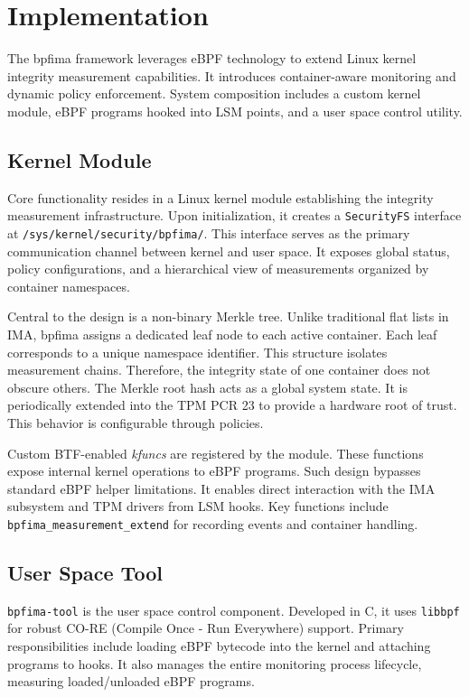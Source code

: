 \section{Implementation}
\label{sec:implementation}

The \ac{bpfima} framework leverages \ac{eBPF} technology to extend Linux kernel integrity measurement capabilities.
It introduces container-aware monitoring and dynamic policy enforcement.
System composition includes a custom kernel module, \ac{eBPF} programs hooked into \ac{LSM} points, and a user space control utility.

\subsection{Kernel Module}
Core functionality resides in a Linux kernel module establishing the integrity measurement infrastructure.
Upon initialization, it creates a \texttt{SecurityFS} interface at \texttt{/sys/kernel/security/bpfima/}.
This interface serves as the primary communication channel between kernel and user space.
It exposes global status, policy configurations, and a hierarchical view of measurements organized by container namespaces.

Central to the design is a non-binary Merkle tree.
Unlike traditional flat lists in \ac{IMA}, \ac{bpfima} assigns a dedicated leaf node to each active container.
Each leaf corresponds to a unique namespace identifier.
This structure isolates measurement chains.
Therefore, the integrity state of one container does not obscure others.
The Merkle root hash acts as a global system state.
It is periodically extended into the \ac{TPM} \ac{PCR} 23 to provide a hardware root of trust.
This behavior is configurable through policies.

Custom \ac{BTF}-enabled \textit{kfuncs} are registered by the module.
These functions expose internal kernel operations to \ac{eBPF} programs.
Such design bypasses standard \ac{eBPF} helper limitations.
It enables direct interaction with the \ac{IMA} subsystem and \ac{TPM} drivers from \ac{LSM} hooks.
Key functions include \texttt{bpfima\_measurement\_extend} for recording events and container handling.

\subsection{User Space Tool}
\texttt{bpfima-tool} is the user space control component.
Developed in C, it uses \texttt{libbpf} for robust \ac{CO-RE} (Compile Once - Run Everywhere) support.
Primary responsibilities include loading \ac{eBPF} bytecode into the kernel and attaching programs to hooks.
It also manages the entire monitoring process lifecycle, measuring loaded/unloaded \ac{eBPF} programs.

